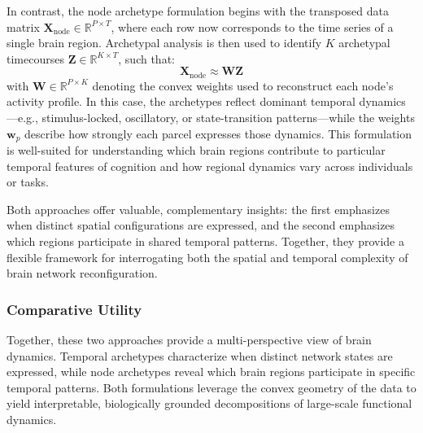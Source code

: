 \documentclass[12pt]{article}
\begin{document}
In contrast, the node archetype formulation begins with the transposed data matrix $\mathbf{X}_{\text{node}} \in \mathbb{R}^{P \times T}$, where each row now corresponds to the time series of a single brain region. Archetypal analysis is then used to identify $K$ archetypal timecourses $\mathbf{Z} \in \mathbb{R}^{K \times T}$, such that:
\[
\mathbf{X}_{\text{node}} \approx \mathbf{W} \mathbf{Z}
\]
with $\mathbf{W} \in \mathbb{R}^{P \times K}$ denoting the convex weights used to reconstruct each node’s activity profile. In this case, the archetypes reflect dominant temporal dynamics—e.g., stimulus-locked, oscillatory, or state-transition patterns—while the weights $\mathbf{w}_p$ describe how strongly each parcel expresses those dynamics. This formulation is well-suited for understanding which brain regions contribute to particular temporal features of cognition and how regional dynamics vary across individuals or tasks.

Both approaches offer valuable, complementary insights: the first emphasizes when distinct spatial configurations are expressed, and the second emphasizes which regions participate in shared temporal patterns. Together, they provide a flexible framework for interrogating both the spatial and temporal complexity of brain network reconfiguration.

\subsubsection*{Comparative Utility}

Together, these two approaches provide a multi-perspective view of brain dynamics. Temporal archetypes characterize when distinct network states are expressed, while node archetypes reveal which brain regions participate in specific temporal patterns. Both formulations leverage the convex geometry of the data to yield interpretable, biologically grounded decompositions of large-scale functional dynamics.
\end{document}
